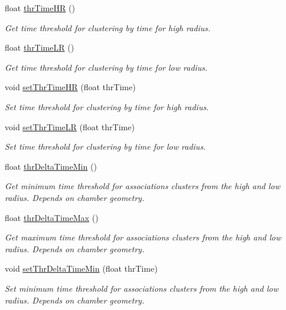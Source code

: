 \begin{DoxyCompactItemize}
float \hyperlink{classiRPCInfo_a3c1dd1f9dab7e7957e0e0e9b0cfea71d}{thr\-Time\-H\-R} ()
\begin{DoxyCompactList}\small\item\em Get time threshold for clustering by time for high radius. \end{DoxyCompactList}\item 
float \hyperlink{classiRPCInfo_aa5b25fa71bbbeb5007d812ac77657a06}{thr\-Time\-L\-R} ()
\begin{DoxyCompactList}\small\item\em Get time threshold for clustering by time for low radius. \end{DoxyCompactList}\item 
void \hyperlink{classiRPCInfo_a2b86440ce96c164e7fbf9f09c4b1577c}{set\-Thr\-Time\-H\-R} (float thr\-Time)
\begin{DoxyCompactList}\small\item\em Set time threshold for clustering by time for high radius. \end{DoxyCompactList}\item 
void \hyperlink{classiRPCInfo_a156bd93ac20bf5259542c784746062b9}{set\-Thr\-Time\-L\-R} (float thr\-Time)
\begin{DoxyCompactList}\small\item\em Set time threshold for clustering by time for low radius. \end{DoxyCompactList}\item 
float \hyperlink{classiRPCInfo_af98b1d3681b5f86b3495c9e85dde92d6}{thr\-Delta\-Time\-Min} ()
\begin{DoxyCompactList}\small\item\em Get minimum time threshold for associations clusters from the high and low radius. Depends on chamber geometry. \end{DoxyCompactList}\item 
float \hyperlink{classiRPCInfo_a47814963058ae5be68ffa44d272d0b9d}{thr\-Delta\-Time\-Max} ()
\begin{DoxyCompactList}\small\item\em Get maximum time threshold for associations clusters from the high and low radius. Depends on chamber geometry. \end{DoxyCompactList}\item 
void \hyperlink{classiRPCInfo_a600c46ef1a119b4520cb0d51dc9b3b8a}{set\-Thr\-Delta\-Time\-Min} (float thr\-Time)
\begin{DoxyCompactList}\small\item\em Set minimum time threshold for associations clusters from the high and low radius. Depends on chamber geometry. \end{DoxyCompactList}\item 

\end{DoxyCompactItemize}
